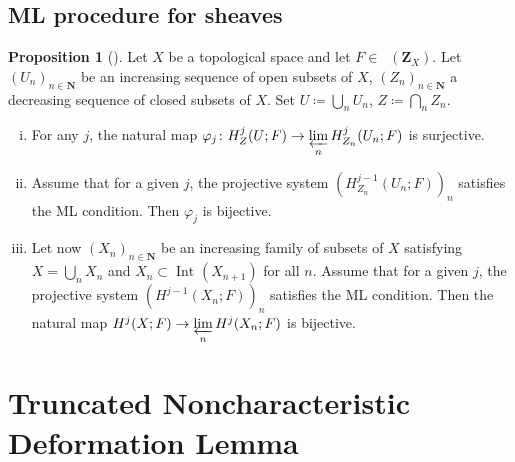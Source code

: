 ﻿\documentclass[a4paper,leqno]{jsarticle}
\theoremstyle{definition}
\newtheorem{Proposition+}[Axiom+]{Proposition}
\newcommand{\nn}{\mathbf{N}}
\newcommand{\zz}{\mathbf{Z}}
\numberwithin{equation}{section}
\newcommand{\Dompl}{\mathop{\mathsf{D}^\mathrm{+}}\nolimits}
\newcommand{\prolim}[1][]{\mathop{\varprojlim}\limits_{#1}}
\theoremstyle{mystyle}
\newcommand{\Int}[1][]{\mathop{\mathrm{Int}}\nolimits_{#1}}
\begin{document}
\subsection*{ML procedure for sheaves}

\begin{Proposition+}[{\cite[Proposition 2.7.1]{KS90}}]\label{prop:ks2.7.1}
  Let \(X\) be a topological space and let \(F\in\Dompl(\zz_X)\). 
  Let \(\left(U_n\right)_{n\in\nn}\) be an increasing sequence 
  of open subsets of \(X\), \(\left(Z_n\right)_{n\in\nn}\) 
  a decreasing sequence of closed subsets of \(X\). 
  Set \(U\coloneqq\bigcup_{n}U_{n}\), 
  \(Z\coloneqq\bigcap_{n}Z_{n}\). 
  \begin{enumerate}[(i)]
    \item \label{item:ks2.7.1.1} For any \(j\), the natural map \(
      \varphi_j\colon H^{j}_{Z}(U;F)
      \to 
      \prolim[n]H^{j}_{Z_{n}}(U_{n};F)
    \) is surjective. 
    \item \label{item:ks2.7.1.2} Assume that for a given \(j\), 
    the projective system \(
      (H^{j-1}_{Z_{n}}(U_{n};F))_{n}
    \) satisfies the ML condition. 
    Then \(\varphi_{j}\) is bijective. 
    \item \label{item:ks2.7.1.3} Let now \(\left(X_{n}\right)_{n\in\nn}\) be 
    an increasing family of subsets of \(X\) satisfying \(
      X=\bigcup_{n}X_n\) and \(X_{n}\subset \Int[](X_{n+1})
    \) for all \(n\). 
    Assume that for a given \(j\), the projective system \(
      \left(H^{j-1}(X_{n};F)\right)_{n}
    \) satisfies the ML condition. 
    Then the natural map \(
      H^{j}(X;F)\to \prolim[n]H^{j}(X_{n};F)
    \) is bijective. 
  \end{enumerate}
\end{Proposition+}


\section{Truncated Noncharacteristic Deformation Lemma}
\end{document}
